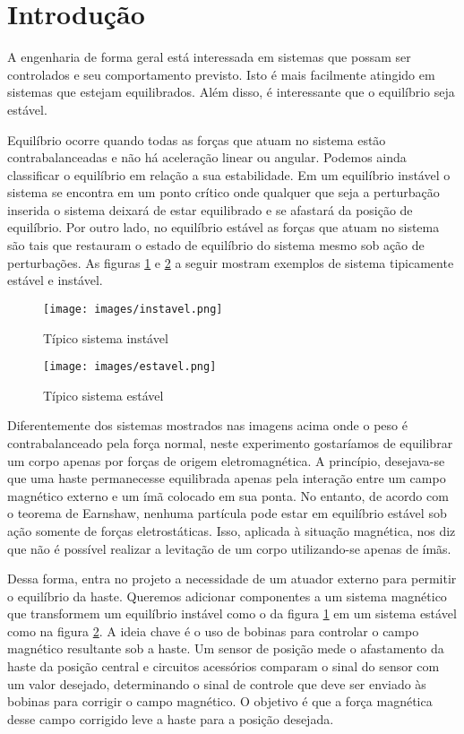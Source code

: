 \section{Introdução}
 A engenharia de forma geral está interessada em sistemas que possam ser controlados e seu comportamento previsto. Isto é mais facilmente atingido em sistemas que estejam equilibrados. Além disso, é interessante que o equilíbrio seja estável. 
 
 Equilíbrio ocorre quando todas as forças que atuam no sistema estão contrabalanceadas e não há aceleração linear ou angular. Podemos ainda classificar o equilíbrio em relação a sua estabilidade.
Em um equilíbrio instável o sistema se encontra em um ponto crítico onde qualquer que seja a perturbação inserida o sistema deixará de estar equilibrado e se afastará da posição de equilíbrio. Por outro lado, no equilíbrio estável as forças que atuam no sistema são tais que restauram o estado de equilíbrio do sistema mesmo sob ação de perturbações. As figuras \ref{fig:intro-instavel} e \ref{fig:intro-estavel} a seguir mostram exemplos de sistema tipicamente estável e instável.

\begin{figure}[H]
\centering
\texttt{[image: images/instavel.png]}
\caption{Típico sistema instável}
\label{fig:intro-instavel}
\end{figure}


\begin{figure}[H]
\centering
\texttt{[image: images/estavel.png]}
\caption{Típico sistema estável}
\label{fig:intro-estavel}
\end{figure}
 
 Diferentemente dos sistemas mostrados nas imagens acima onde o peso é contrabalanceado pela força normal, neste experimento gostaríamos de equilibrar um corpo apenas por forças de origem eletromagnética. A princípio, desejava-se que uma haste permanecesse equilibrada apenas pela interação entre um campo magnético externo e um ímã colocado em sua ponta. No entanto, de acordo com o teorema de Earnshaw, nenhuma partícula pode estar em equilíbrio estável sob ação somente de forças eletrostáticas. Isso, aplicada à situação magnética, nos diz que não é possível realizar a levitação de um corpo utilizando-se apenas de ímãs.


Dessa forma, entra no projeto a necessidade de um atuador externo para permitir o equilíbrio da haste. Queremos adicionar componentes a um sistema magnético que transformem um equilíbrio instável como o da figura \ref{fig:intro-instavel} em um sistema estável como na figura \ref{fig:intro-estavel}.
A ideia chave é o uso de bobinas para controlar o campo magnético resultante sob a haste. Um sensor de posição mede o afastamento da haste da posição central e circuitos acessórios comparam o sinal do sensor com um valor desejado, determinando o sinal de controle que deve ser enviado às bobinas para corrigir o campo magnético. O objetivo é que a  força magnética desse campo corrigido leve a haste
para a posição desejada.   


